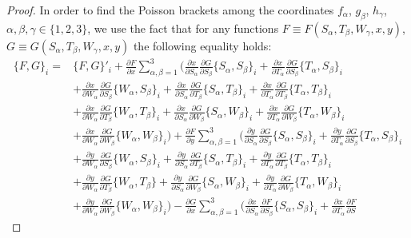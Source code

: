 \documentclass[pdftex]{sigma}
\def\a{\alpha}
\def\b{\beta}
\def\g{\gamma}
\numberwithin{equation}{section}
\begin{document}
\begin{proof}
In order to find the Poisson brackets among the coordinates $f_{\a}$, $g_{\b}$, $h_{\g}$, $\a,\b,\g \in \{1,2,3\}$, we use the fact that for any functions $F\equiv F(S_{\a}, T_{\b}, W_{\g}, x,y)$, $G\equiv G(S_{\a}, T_{\b}, W_{\g}, x, y)$ the following equality holds:
\begin{align*}%
\{ F, G \}_i={}&\{ F, G \}'_i+
\frac{\partial F}{ \partial x}\sum\limits_{\a,\b=1}^3\biggl( \frac{\partial x}{\partial S_{ \a}}
\frac{\partial G}{\partial S_{ \b}}\{S_{\a},S_{\b}\}_i+
\frac{\partial x}{\partial T_{ \a}} \frac{\partial G}{\partial S_{
\b}}\{T_{\a},S_{\b}\}_i\\
&
+ \frac{\partial x}{\partial W_{ \a}}
\frac{\partial G}{\partial S_{ \b}}\{W_{\a},S_{\b}\}_i +\frac{\partial x}{\partial S_{ \a}}
\frac{\partial G}{\partial T_{ \b}}\{S_{\a},T_{\b}\}_i+ \frac{\partial x}{\partial T_{ \a}} \frac{\partial G}{\partial
T_{ \b}}\{T_{\a},T_{\b}\}_i
\\
& +\frac{\partial x}{\partial W_{ \a}}
\frac{\partial G}{\partial T_{ \b}}\{W_{\a},T_{\b}\}_i
+ \frac{\partial x}{\partial S_{ \a}}
\frac{\partial G}{\partial W_{ \b}}\{S_{\a},W_{\b}\}_i+\frac{\partial x}{\partial T_{ \a}} \frac{\partial G}{\partial
W_{ \b}}\{T_{\a},W_{\b}\}_i\\
&+ \frac{\partial x}{\partial W_{ \a}}
\frac{\partial G}{\partial W_{ \b}}\{W_{\a},W_{\b}\}_i \biggr)+
\frac{\partial F}{ \partial y}
\sum\limits_{\a,\b=1}^3 \biggl( \frac{\partial y}{\partial S_{ \a}}
\frac{\partial G}{\partial S_{ \b}}\{S_{\a},S_{\b}\}_i+
\frac{\partial y}{\partial T_{ \a}} \frac{\partial G}{\partial S_{
\b}}\{T_{\a},S_{\b}\}_i\\
& +
 \frac{\partial y}{\partial W_{ \a}}
\frac{\partial G}{\partial S_{ \b}}\{W_{\a},S_{\b}\}_i+ \frac{\partial y}{\partial S_{ \a}}
\frac{\partial G}{\partial T_{ \b}}\{S_{\a},T_{\b}\}_i
+
 \frac{\partial y}{\partial T_{ \a}} \frac{\partial G}{\partial
T_{ \b}}\{T_{\a},T_{\b}\}_i\\
& +
\frac{\partial y}{\partial W_{ \a}}
\frac{\partial G}{\partial T_{ \b}}\{W_{\a},T_{\b}\}
+ \frac{\partial y}{\partial S_{ \a}}
\frac{\partial G}{\partial W_{ \b}}\{S_{\a},W_{\b}\}_i+
 \frac{\partial y}{\partial T_{ \a}} \frac{\partial G}{\partial
W_{ \b}}\{T_{\a},W_{\b}\}_i\\
&+ \frac{\partial y}{\partial W_{ \a}}
\frac{\partial G}{\partial W_{ \b}}\{W_{\a},W_{\b}\}_i \biggr)-
 \frac{\partial G}{ \partial x} \sum\limits_{\a,\b=1}^3 \biggl( \frac{\partial x}{\partial S_{ \a}}
\frac{\partial F}{\partial S_{ \b}}\{S_{\a},S_{\b}\}_i
+\frac{\partial x}{\partial T_{ \a}} \frac{\partial F}{\partial S_{
}}
\end{align*}
\end{proof}
\end{document}
